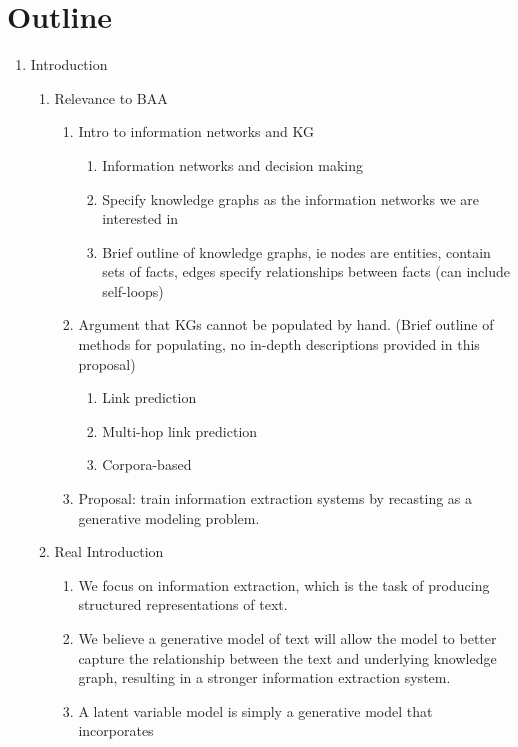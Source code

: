\documentclass[12pt]{article}
\begin{document}
\section*{Outline}
\begin{enumerate}
\item Introduction
    \begin{enumerate}
    \item Relevance to BAA
        \begin{enumerate}
        \item Intro to information networks and KG
            \begin{enumerate}
            \item Information networks and decision making
            \item Specify knowledge graphs as the information networks we are interested in
            \item Brief outline of knowledge graphs, ie nodes are entities, contain sets of facts,
                edges specify relationships between facts (can include self-loops)
            \end{enumerate}
        \item Argument that KGs cannot be populated by hand. (Brief outline of methods for populating,
            no in-depth descriptions provided in this proposal)
            \begin{enumerate}
            \item Link prediction
            \item Multi-hop link prediction
            \item Corpora-based
            \end{enumerate}
        \item Proposal: train information extraction systems by recasting as a
            generative modeling problem.
        \end{enumerate}
    \item Real Introduction
        \begin{enumerate}
        \item We focus on information extraction, which is the task of producing structured
            representations of text.
        \item We believe a generative model of text will allow the model to better capture
            the relationship between the text and underlying knowledge graph,
            resulting in a stronger information extraction system.
        \item A latent variable model is simply a generative model that incorporates 

\end{enumerate}
\end{enumerate}
\end{enumerate}
\end{document}
